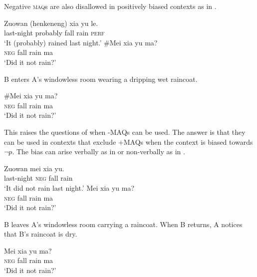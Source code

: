 \documentclass[output=paper,colorlinks,citecolor=brown]{langscibook}
\begin{document}
Negative \textsc{maq}s are also disallowed in positively biased contexts as in .

\begin{exe}
\ex \label{posnmaq} 
\begin{xlist}
\gll Zuowan (henkeneng) xia yu le.\\
last-night probably fall rain \textsc{perf}\\
\glt  `It (probably) rained last night.' 
\#\gll Mei xia yu ma?\\
\textsc{neg} fall rain ma\\
\glt `Did it not rain?'
\end{xlist}
\ex \label{nonv} B enters A's windowless room wearing a dripping wet raincoat.
\begin{xlist}
 \#\gll Mei xia yu ma?\\
\textsc{neg} fall rain ma\\
\glt `Did it not rain?'
\end{xlist}
\end{exe}
	
	
This raises the questions of when -MAQs can be used. The answer is that they can be used in contexts that exclude +MAQs when the context is biased towards $\neg p$.  The bias can arise verbally  as in  or non-verbally as in .
	
	
\ea\label{xiayune}
\begin{xlist}
 \gll Zuowan mei xia yu. \\
last-night \textsc{neg} fall rain\\
\glt `It did not rain last night.'
 \gll Mei xia yu  ma? \\
\textsc{neg} fall rain ma\\
\glt `Did it not rain?' 
\end{xlist}
\z


\begin{exe}
\ex\label{nonvnp}  B leaves A's  windowless  room carrying a raincoat. When B returns, A notices that B's raincoat is dry.
\begin{xlist}
 \gll Mei xia yu  ma? \\
\textsc{neg} fall rain ma\\
\glt `Did it not rain?'
\end{xlist}
\end{exe}
\end{document}
